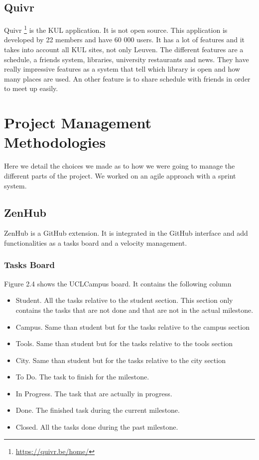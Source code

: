 \documentclass[11pt, a4paper]{report}
\begin{document}
\subsection{Quivr}
Quivr \footnote{\url{https://quivr.be/home/}} is the KUL application. It is not open source. This application is developed by 22 members and have 60 000 users. It has a lot of features and it takes into account all KUL sites, not only Leuven. The different features are a schedule, a friends system, libraries, university restaurants and news. They have really impressive features as a system that tell which library is open and how many places are used. An other feature is to share schedule with friends in order to meet up easily. 


\section{Project Management Methodologies}

Here we detail the choices we made as to how we were going to manage the different parts of the project. We worked on an agile approach with a sprint system. 


\subsection{ZenHub}
ZenHub is a GitHub extension. It is integrated in the GitHub interface and add functionalities as a tasks board and a velocity management.  

\subsubsection{Tasks Board}
Figure 2.4 shows the UCLCampus board. It contains the following column
\begin{itemize}
\item Student. All the tasks relative to the student section. This section only contains the tasks that are not done and that are not in the actual milestone.
\item Campus. Same than student but for the tasks relative to the campus section
\item Tools. Same than student but for the tasks relative to the tools section
\item City. Same than student but for the tasks relative to the city section
\item To Do. The task to finish for the milestone.
\item In Progress. The task that are actually in progress.
\item Done. The finished task during the current milestone.
\item Closed. All the tasks done during the past milestone.
\end{itemize}
\end{document}
